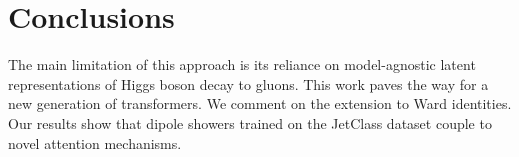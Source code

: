 \section{Conclusions}\label{sec:conclusions}

The main limitation of this approach is its reliance on model-agnostic
latent representations of Higgs boson decay to gluons. This work paves
the way for a new generation of transformers. We comment on the
extension to Ward identities. Our results show that dipole showers
trained on the JetClass dataset couple to novel attention mechanisms.

